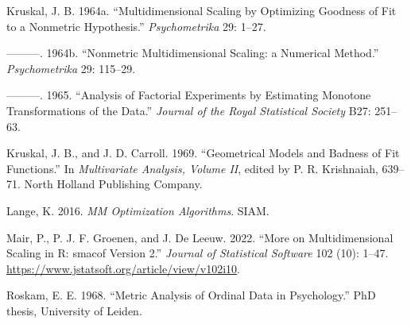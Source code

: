 \documentclass[
  12pt,
]{article}
\newlength{\cslhangindent}
\newenvironment{CSLReferences}[2] %
 {\begin{list}{}{%
  \setlength{\itemindent}{0pt}
  \setlength{\leftmargin}{0pt}
  \setlength{\parsep}{0pt}
  \ifodd #1
   \setlength{\leftmargin}{\cslhangindent}
   \setlength{\itemindent}{-1\cslhangindent}
  \fi
  \setlength{\itemsep}{#2\baselineskip}}}
 {\end{list}}
\theoremstyle{definition}
\theoremstyle{definition}
\theoremstyle{definition}
\theoremstyle{definition}
\theoremstyle{remark}
\begin{document}
\begin{CSLReferences}{1}{0}
Kruskal, J. B. 1964a. {``{Multidimensional Scaling by Optimizing Goodness of Fit to a Nonmetric Hypothesis}.''} \emph{Psychometrika} 29: 1--27.

---------. 1964b. {``{Nonmetric Multidimensional Scaling: a Numerical Method}.''} \emph{Psychometrika} 29: 115--29.

---------. 1965. {``{Analysis of Factorial Experiments by Estimating Monotone Transformations of the Data}.''} \emph{Journal of the Royal Statistical Society} B27: 251--63.

Kruskal, J. B., and J. D. Carroll. 1969. {``{Geometrical Models and Badness of Fit Functions}.''} In \emph{Multivariate Analysis, Volume II}, edited by P. R. Krishnaiah, 639--71. North Holland Publishing Company.

Lange, K. 2016. \emph{MM Optimization Algorithms}. SIAM.

Mair, P., P. J. F. Groenen, and J. De Leeuw. 2022. {``{More on Multidimensional Scaling in R: smacof Version 2}.''} \emph{Journal of Statistical Software} 102 (10): 1--47. \url{https://www.jstatsoft.org/article/view/v102i10}.

Roskam, E. E. 1968. {``{Metric Analysis of Ordinal Data in Psychology}.''} PhD thesis, University of Leiden.

\end{CSLReferences}
\end{document}
